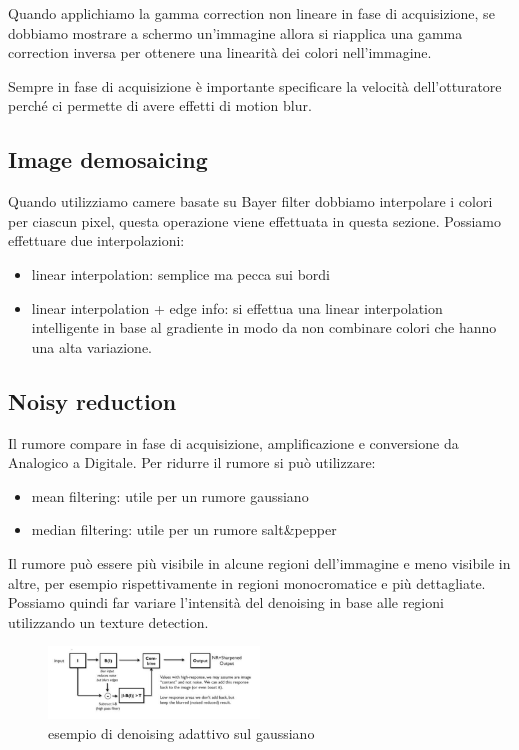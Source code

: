 \begin{nota}
    Quando applichiamo la gamma correction non lineare in fase di acquisizione, se
    dobbiamo mostrare a schermo un'immagine allora si riapplica una gamma correction 
    inversa per ottenere una linearità dei colori nell'immagine.
\end{nota}

Sempre in fase di acquisizione è importante specificare la velocità dell'otturatore
perché ci permette di avere effetti di motion blur.

\subsection{Image demosaicing}
Quando utilizziamo camere basate su Bayer filter dobbiamo interpolare i colori per 
ciascun pixel, questa operazione viene effettuata in questa sezione. Possiamo 
effettuare due interpolazioni:
\begin{itemize}
    \item linear interpolation: semplice ma pecca sui bordi
    \item linear interpolation + edge info: si effettua una linear interpolation intelligente 
    in base al gradiente in modo da non combinare colori che hanno una alta variazione.
\end{itemize}
\subsection{Noisy reduction}
Il rumore compare in fase di acquisizione, amplificazione e conversione da Analogico a Digitale.
Per ridurre il rumore si può utilizzare:
\begin{itemize}
    \item mean filtering: utile per un rumore gaussiano
    \item median filtering: utile per un rumore salt\&pepper
\end{itemize} 

Il rumore può essere più visibile in alcune regioni dell'immagine e meno visibile 
in altre, per esempio rispettivamente in regioni monocromatice e più dettagliate.
Possiamo quindi far variare l'intensità del denoising in base alle regioni utilizzando 
un texture detection.

\begin{figure}[h]
    \centering
    \includegraphics[width=0.5\textwidth]{img/denoising_gaussiano_adattivo.png}
    \caption{esempio di denoising adattivo sul gaussiano}
\end{figure}


